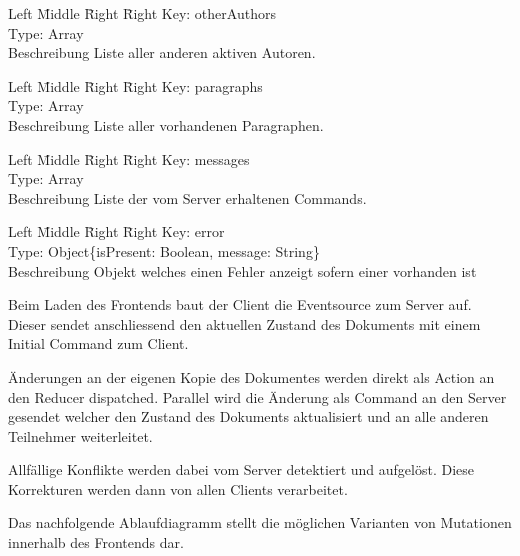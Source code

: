 \begin{tabbing}
    Left \= Middle \= Right \= Right \kill
    Key:  \> \> \> otherAuthors\\
    Type:  \> \> \> Array \\
    Beschreibung \>  \> \> Liste aller anderen aktiven Autoren.\\
\end{tabbing}

\begin{tabbing}
    Left \= Middle \= Right \= Right \kill
    Key:  \> \> \> paragraphs\\
    Type:  \> \> \> Array \\
    Beschreibung \>  \> \> Liste aller vorhandenen Paragraphen.\\
\end{tabbing}

\begin{tabbing}
    Left \= Middle \= Right \= Right \kill
    Key:  \> \> \> messages\\
    Type:  \> \> \> Array \\
    Beschreibung \>  \> \> Liste der vom Server erhaltenen Commands.\\
\end{tabbing}

\begin{tabbing}
    Left \= Middle \= Right \= Right \kill
    Key:  \> \> \> error\\
    Type:  \> \> \> Object\{isPresent: Boolean, message: String\} \\
    Beschreibung \>  \> \> Objekt welches einen Fehler anzeigt sofern einer vorhanden ist\\
\end{tabbing}

Beim Laden des Frontends baut der Client die Eventsource zum Server auf.
Dieser sendet anschliessend den aktuellen Zustand des Dokuments mit einem Initial Command zum Client.

Änderungen an der eigenen Kopie des Dokumentes werden direkt als Action an den Reducer dispatched.
Parallel wird die Änderung als Command an den Server gesendet welcher den Zustand des Dokuments aktualisiert und an alle anderen Teilnehmer weiterleitet.

Allfällige Konflikte werden dabei vom Server detektiert und aufgelöst.
Diese Korrekturen werden dann von allen Clients verarbeitet.

Das nachfolgende Ablaufdiagramm stellt die möglichen Varianten von Mutationen innerhalb des Frontends dar.

